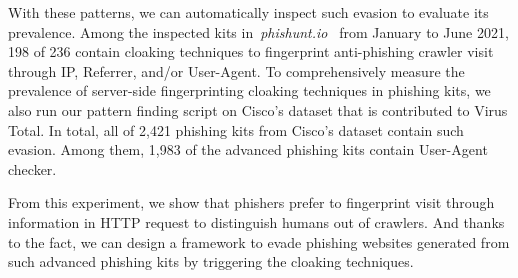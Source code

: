 With these patterns, we can automatically inspect such evasion to evaluate its prevalence.
Among the inspected kits in~\emph{phishunt.io}~\cite{phishunt} from January to June 2021, 198 of 236 contain cloaking techniques to fingerprint anti-phishing crawler visit through IP, Referrer, and/or User-Agent.
To comprehensively measure the prevalence of server-side fingerprinting cloaking techniques in phishing kits,
we also run our pattern finding script on Cisco's dataset that is contributed to Virus Total.
In total, all of 2,421 phishing kits from Cisco's dataset contain such evasion.
Among them, 1,983 of the advanced phishing kits contain User-Agent checker.

From this experiment,
we show that phishers prefer to fingerprint visit through information in HTTP request to distinguish humans out of crawlers.
And thanks to the fact, 
we can design a framework to evade phishing websites generated from such advanced phishing kits by triggering the cloaking techniques.